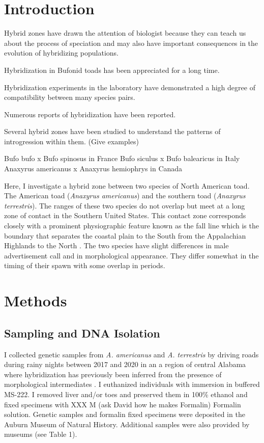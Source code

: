 \section{Introduction}

Hybrid zones have drawn the attention of biologist because they can teach us
about the process of speciation and may also have important consequences in the
evolution of hybridizing populations.

Hybridization in Bufonid toads has been appreciated for a long time. 

Hybridization experiments in the laboratory have demonstrated a high degree 
of compatibility between many species pairs.

Numerous reports of hybridization have been reported.

Several hybrid zones have been studied to understand the patterns of introgression within them. (Give examples)

Bufo bufo x Bufo spinosus in France \parencite{vanriemsdijk2023}
Bufo siculus x Bufo balearicus in Italy \parencite{colliard2010}
Anaxyrus americanus x Anaxyrus hemiophrys in Canada \parencite{green1983}


Here, I investigate a hybrid zone between two species of North American toad.
The American toad (\textit{Anaxyrus americanus}) and the southern toad 
(\textit{Anaxyrus terrestris}). The ranges of these two species do not overlap
but meet at a long zone of contact in the Southern United States. This contact 
zone corresponds closely with a prominent physiographic feature known as the fall  
line which is the boundary that separates the coastal plain to the South from the 
Appalachian Highlands to the North \parencite{shankman2007}.
The two species have slight differences in male advertisement call and in 
morphological appearance. They differ somewhat in the timing of their spawn  
with some overlap in periods.



\section{Methods}
\subsection{Sampling and DNA Isolation}
I collected genetic samples from \textit{A. americanus} and \textit{A. terrestris}
by driving roads during rainy nights between 2017 and 2020
in an a region of central Alabama where hybridization has previously been
inferred from the presence of morphological intermediates \parencite{weatherby1982}. 
I euthanized individuals with immersion in buffered MS-222.
I removed liver and/or toes and preserved them in 100\% ethanol and fixed 
specimens with XXX M (ask David how he makes Formalin) Formalin solution.
Genetic samples and formalin fixed specimens were deposited in the Auburn Museum of Natural History.
Additional samples were also provided by museums (see Table 1).

